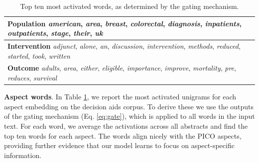 \documentclass[11pt,a4paper]{article}
\begin{document}
\begin{table}%
\small
\centering
\begin{tabularx}{\columnwidth}{X}
{\bf Population} \emph{american}, \emph{area}, \emph{breast}, \emph{colorectal}, \emph{diagnosis}, \emph{inpatients}, \emph{outpatients}, \emph{stage}, \emph{their}, \emph{uk} \\ \hline
{\bf Intervention} \emph{adjunct}, \emph{alone}, \emph{an}, \emph{discussion}, \emph{intervention}, \emph{methods}, \emph{reduced}, \emph{started}, \emph{took}, \emph{written} \\ \hline
{\bf Outcome} \emph{adults}, \emph{area}, \emph{either}, \emph{eligible}, \emph{importance}, \emph{improve}, \emph{mortality}, \emph{pre}, \emph{reduces}, \emph{survival} \\ %
\end{tabularx}
\vspace{-1em}
\caption{Top ten most activated words, as determined by the gating mechanism.}
\label{table:picomost}
\vspace{-1em}
\end{table}

\vspace{.15em}
\noindent \textbf{Aspect words}. In Table \ref{table:picomost}, we report the most activated unigrams for each aspect embedding on the decision aids corpus. To derive these we use the outputs of the gating mechanism (Eq. \ref{eq:gate}), which is applied to all words in the input text. For each word, we average the activations across all abstracts and find the top ten words for each aspect. The words align nicely with the PICO aspects, providing further evidence that our model learns to focus on aspect-specific information. %
\end{document}
